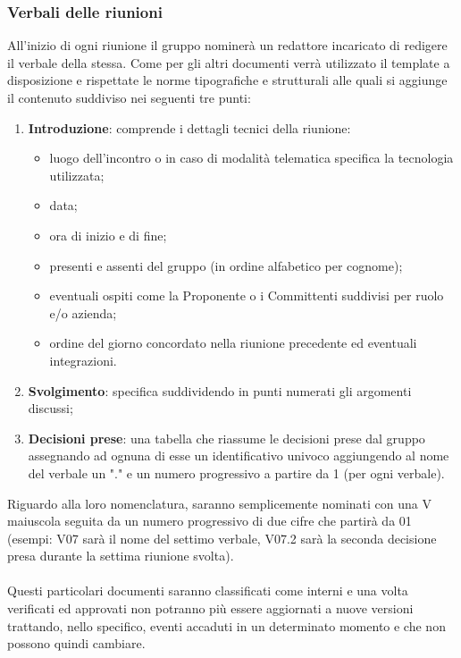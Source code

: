 	\subsubsection{Verbali delle riunioni}
	All'inizio di ogni riunione il gruppo nominerà un redattore incaricato di redigere il verbale della stessa.
	Come per gli altri documenti verrà utilizzato il template a disposizione e rispettate le norme tipografiche e strutturali alle quali si aggiunge il contenuto suddiviso nei seguenti tre punti:
	\begin{enumerate}
		\item \textbf{Introduzione}: comprende i dettagli tecnici della riunione:
		\begin{itemize}
			\item luogo dell'incontro o in caso di modalità telematica specifica la tecnologia utilizzata;
			\item data;
			\item ora di inizio e di fine;
			\item presenti e assenti del gruppo (in ordine alfabetico per cognome);
			\item eventuali ospiti come la Proponente o i Committenti suddivisi per ruolo e/o azienda;
			\item ordine del giorno concordato nella riunione precedente ed eventuali integrazioni.
		\end{itemize}
		\item \textbf{Svolgimento}: specifica suddividendo in punti numerati gli argomenti discussi;
		\item \textbf{Decisioni prese}: una tabella che riassume le decisioni prese dal gruppo assegnando ad ognuna di esse un identificativo univoco aggiungendo al nome del verbale un "." e un numero progressivo a partire da 1 (per ogni verbale).
	\end{enumerate}
	Riguardo alla loro nomenclatura, saranno semplicemente nominati con una V maiuscola seguita da un numero progressivo di due cifre che partirà da 01 (esempi: V07 sarà il nome del settimo verbale, V07.2 sarà la seconda decisione presa durante la settima riunione svolta).\\
	\\Questi particolari documenti saranno classificati come interni e una volta verificati ed approvati non potranno più essere aggiornati a nuove versioni trattando, nello specifico, eventi accaduti in un determinato momento e che non possono quindi cambiare.
		
